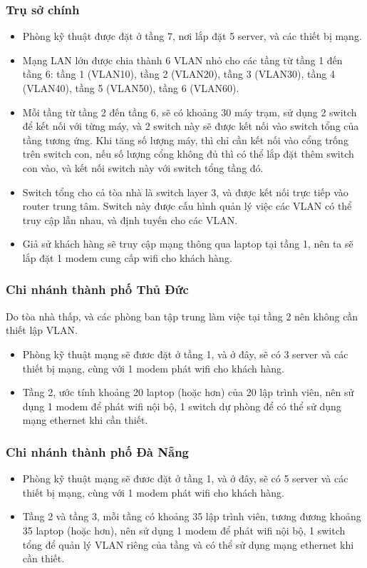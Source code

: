 \documentclass[a4paper]{article}
\begin{document}
\subsubsection{Trụ sở chính}
\begin{itemize}
    \item Phòng kỹ thuật được đặt ở tầng 7, nơi lắp đặt 5 server, và các thiết bị mạng.
    \item Mạng LAN lớn được chia thành 6 VLAN nhỏ cho các tầng từ tầng 1 đến tầng 6: tầng 1 (VLAN10), tầng 2 (VLAN20), tầng 3 (VLAN30), tầng 4 (VLAN40), tầng 5 (VLAN50), tầng 6 (VLAN60).
    \item Mỗi tầng từ tầng 2 đến tầng 6, sẽ có khoảng 30 máy trạm, sử dụng 2 switch để kết nối với từng máy, và 2 switch này sẽ được kết nối vào switch tổng của tầng tương ứng. Khi tăng số lượng máy, thì chỉ cần kết nối vào cổng trống trên switch con, nếu số lượng cổng không đủ thì có thể lắp đặt thêm switch con vào, và kết nối switch này với switch tổng tầng đó.
    \item Switch tổng cho cả tòa nhà là switch layer 3, và được kết nối trực tiếp vào router trung tâm. Switch này được cấu hình quản lý việc các VLAN có thể truy cập lẫn nhau, và định tuyến cho các VLAN.
    \item Giả sử khách hàng sẽ truy cập mạng thông qua laptop tại tầng 1, nên ta sẽ lắp đặt 1 modem cung cấp wifi cho khách hàng.
\end{itemize}

\subsubsection{Chi nhánh thành phố Thủ Đức}
Do tòa nhà thấp, và các phòng ban tập trung làm việc tại tầng 2 nên không cần thiết lập VLAN.
\begin{itemize}
    \item Phòng kỹ thuật mạng sẽ đươc đặt ở tầng 1, và ở đây, sẽ có 3 server và các thiết bị mạng, cùng với 1 modem phát wifi cho khách hàng.
    \item Tầng 2, ước tính khoảng 20 laptop (hoặc hơn) của 20 lập trình viên, nên sử dụng 1 modem để phát wifi nội bộ, 1 switch dự phòng để có thể sử dụng mạng ethernet khi cần thiết. %
\end{itemize}

\subsubsection{Chi nhánh thành phố Đà Nẵng}
\begin{itemize}
    \item Phòng kỹ thuật mạng sẽ đươc đặt ở tầng 1, và ở đây, sẽ có 5 server và các thiết bị mạng, cùng với 1 modem phát wifi cho khách hàng.
    \item Tầng 2 và tầng 3, mỗi tầng có khoảng 35 lập trình viên, tương đương khoảng 35 laptop (hoặc hơn), nên sử dụng 1 modem để phát wifi nội bộ, 1 switch tổng để quản lý VLAN riêng của tầng và có thể sử dụng mạng ethernet khi cần thiết.
\end{itemize}
\end{document}
